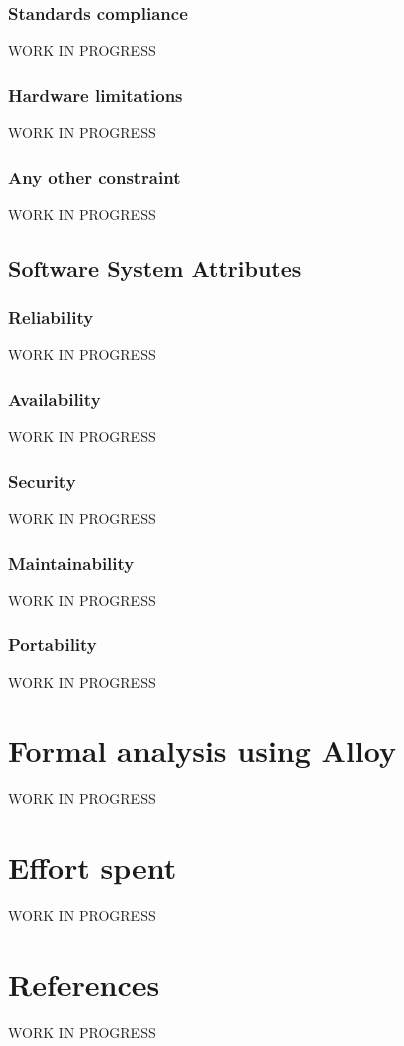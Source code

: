\documentclass{report}
\begin{document}
			\subsection{Standards compliance}
			WORK IN PROGRESS
			\subsection{Hardware limitations}
			WORK IN PROGRESS
			\subsection{Any other constraint}
			WORK IN PROGRESS
		\section{Software System Attributes}
			\subsection{Reliability}
			WORK IN PROGRESS
			\subsection{Availability}
			WORK IN PROGRESS
			\subsection{Security}
			WORK IN PROGRESS
			\subsection{Maintainability}
			WORK IN PROGRESS
			\subsection{Portability}
			WORK IN PROGRESS
	\chapter{Formal analysis using Alloy}
	WORK IN PROGRESS
	\chapter{Effort spent}
	WORK IN PROGRESS
	\chapter{References}
	WORK IN PROGRESS
	
\end{document}
